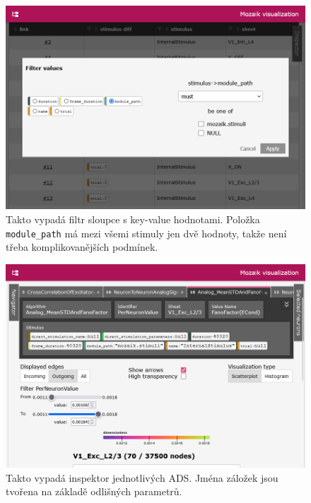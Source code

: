\begin{figure}
	\centering
	\includegraphics[width=1\linewidth]{img/screenshot_filter.png}
	\caption{Takto vypadá filtr sloupce s key-value hodnotami. Položka \lstinline|module_path| má mezi všemi stimuly jen dvě hodnoty, takže není třeba komplikovanějších podmínek.}
	\label{fig:filter}
\end{figure}

\begin{figure}
	\centering
	\includegraphics[width=1\linewidth]{img/screenshot_tabs.png}
	\caption{Takto vypadá inspektor jednotlivých ADS. Jména záložek jsou tvořena na základě odlišných parametrů.}
	\label{fig:tabs}
\end{figure}

